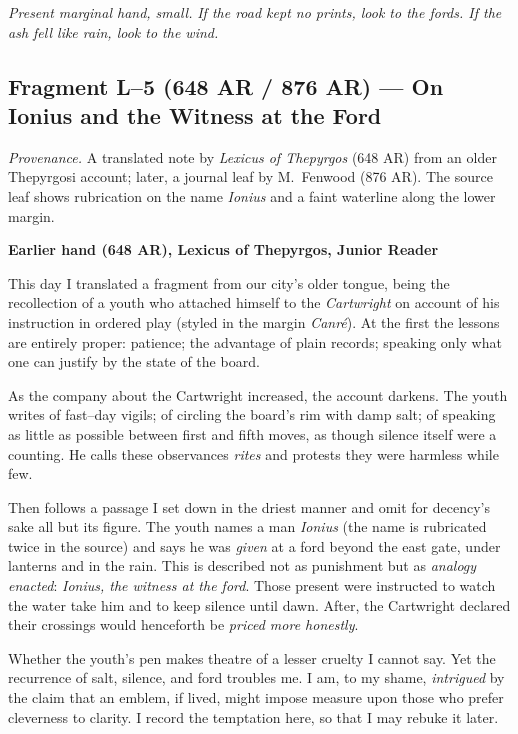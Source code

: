 \documentclass[11pt]{article}
\numberwithin{equation}{section} %
\theoremstyle{plain} %
\theoremstyle{definition} %
\theoremstyle{remark} %
\begin{document}
\medskip
\noindent\textit{Present marginal hand, small.} \emph{If the road kept no prints, look to the fords. If the ash fell like rain, look to the wind.}
\subsection{Fragment L--5 (648 AR / 876 AR) — On Ionius and the Witness at the Ford}
\label{frag:l5}

\noindent\textit{Provenance.} A translated note by \textit{Lexicus of Thepyrgos} (648 AR) from an older Thepyrgosi account; later, a journal leaf by M.\ Fenwood (876 AR). The source leaf shows rubrication on the name \emph{Ionius} and a faint waterline along the lower margin.

\medskip
\noindent\textbf{Earlier hand (648 AR), Lexicus of Thepyrgos, Junior Reader}

This day I translated a fragment from our city’s older tongue, being the recollection of a youth who attached himself to the \textit{Cartwright} on account of his instruction in ordered play (styled in the margin \textit{Canr\'e}). At the first the lessons are entirely proper: patience; the advantage of plain records; speaking only what one can justify by the state of the board.

As the company about the Cartwright increased, the account darkens. The youth writes of fast–day vigils; of circling the board’s rim with damp salt; of speaking as little as possible between first and fifth moves, as though silence itself were a counting. He calls these observances \textit{rites} and protests they were harmless while few.

Then follows a passage I set down in the driest manner and omit for decency’s sake all but its figure. The youth names a man \emph{Ionius} (the name is rubricated twice in the source) and says he was \emph{given} at a ford beyond the east gate, under lanterns and in the rain. This is described not as punishment but as \emph{analogy enacted}: \textit{Ionius, the witness at the ford}. Those present were instructed to watch the water take him and to keep silence until dawn. After, the Cartwright declared their crossings would henceforth be \emph{priced more honestly}.

Whether the youth’s pen makes theatre of a lesser cruelty I cannot say. Yet the recurrence of salt, silence, and ford troubles me. I am, to my shame, \emph{intrigued} by the claim that an emblem, if lived, might impose measure upon those who prefer cleverness to clarity. I record the temptation here, so that I may rebuke it later.
\end{document}
